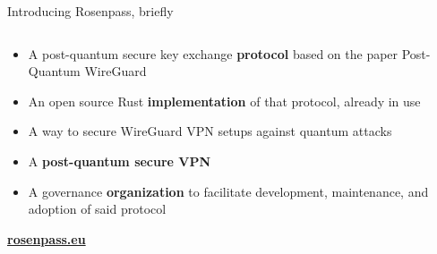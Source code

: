 \begin{frame}{Introducing Rosenpass, briefly}
  \begin{columns}[fullwidth,c]

    \begin{column}{.7\linewidth}
      \begin{itemize}
        \item A post-quantum secure key exchange \textbf{protocol}
          {\small based on the paper Post-Quantum WireGuard~\citePqwg}
        \item An open source Rust \textbf{implementation} of that protocol, already in use
        \item A way to secure WireGuard VPN setups against quantum attacks
        \item A \textbf{post-quantum secure VPN}
        \item A governance \textbf{organization} to facilitate development, maintenance, and adoption of said protocol
      \end{itemize}
      \bigskip
      \textbf{\url{rosenpass.eu}}
    \end{column}%
  \end{columns}
\end{frame}

